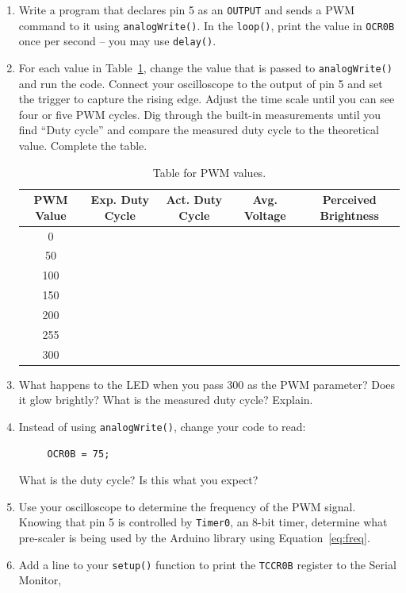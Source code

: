 \documentclass[11pt]{article} %
\begin{document}
\begin{enumerate}
\item Write a program that declares pin 5 as an \verb|OUTPUT| and sends a PWM command to it using \verb|analogWrite()|. In the \verb|loop()|, print the value in \verb|OCR0B| once per second -- you may use \verb|delay()|.
\item For each value in Table~\ref{tab:duty.cycle}, change the value that is passed to \verb|analogWrite()| and run the code. Connect your oscilloscope to the output of pin 5 and set the trigger to capture the rising edge. Adjust the time scale until you can see four or five PWM cycles. Dig through the built-in measurements until you find ``Duty cycle'' and compare the measured duty cycle to the theoretical value. Complete the table.
\begin{table}[h]
\centering
\begin{tabular}{c|c|c|c|c}
PWM Value & Exp. Duty Cycle & Act. Duty Cycle & Avg. Voltage & Perceived Brightness\\
\hline\hline
0&&&&\\
\hline
50&&&&\\
\hline
100&&&&\\
\hline
150&&&&\\
\hline
200&&&&\\
\hline
255&&&&\\
\hline
300&&&&\\
\hline
\end{tabular}
\caption{Table for PWM values.}
\label{tab:duty.cycle}
\end{table}

\item What happens to the LED when you pass 300 as the PWM parameter? Does it glow brightly? What is the measured duty cycle? Explain.
\vspace{1in}

\item Instead of using \verb|analogWrite()|, change your code to read:
\begin{verbatim}
     OCR0B = 75;
\end{verbatim}
What is the duty cycle? Is this what you expect?

\vspace{0.5in}
\item Use your oscilloscope to determine the frequency of the PWM signal. Knowing that pin 5 is controlled by \verb|Timer0|, an 8-bit timer, determine what pre-scaler is being used by the Arduino library using Equation~\ref{eq:freq}.

\vspace{0.5in}
\item Add a line to your \verb|setup()| function to print the \verb|TCCR0B| register to the Serial Monitor,


\end{enumerate}
\end{document}
